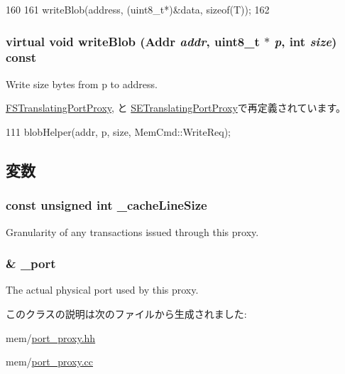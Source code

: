 \begin{DoxyCode}
160 {
161     writeBlob(address, (uint8_t*)&data, sizeof(T));
162 }
\end{DoxyCode}
\hypertarget{classPortProxy_af68c0d93cdb9ff9c4df789c4c9029709}{
\subsubsection[{writeBlob}]{\setlength{\rightskip}{0pt plus 5cm}virtual void writeBlob ({\bf Addr} {\em addr}, \/  uint8\_\-t $\ast$ {\em p}, \/  int {\em size}) const}}
\label{classPortProxy_af68c0d93cdb9ff9c4df789c4c9029709}
Write size bytes from p to address. 

\hyperlink{classFSTranslatingPortProxy_ad2a72c978fca534c6afc8b0f6ac2fe19}{FSTranslatingPortProxy}, と \hyperlink{classSETranslatingPortProxy_ad2a72c978fca534c6afc8b0f6ac2fe19}{SETranslatingPortProxy}で再定義されています。


\begin{DoxyCode}
111     { blobHelper(addr, p, size, MemCmd::WriteReq); }
\end{DoxyCode}


\subsection{変数}
\hypertarget{classPortProxy_a6e1b97389f603fc046fbb42ba91136e2}{
\subsubsection[{\_\-cacheLineSize}]{\setlength{\rightskip}{0pt plus 5cm}const unsigned int {\bf \_\-cacheLineSize}}}
\label{classPortProxy_a6e1b97389f603fc046fbb42ba91136e2}
Granularity of any transactions issued through this proxy. \hypertarget{classPortProxy_a670fb48d4e7284a258fb4ab405d2fba3}{
\subsubsection[{\_\-port}]{\& {\bf \_\-port}}}
\label{classPortProxy_a670fb48d4e7284a258fb4ab405d2fba3}
The actual physical port used by this proxy. 

このクラスの説明は次のファイルから生成されました:\begin{DoxyCompactItemize}
\item 
mem/\hyperlink{port__proxy_8hh}{port\_\-proxy.hh}\item 
mem/\hyperlink{port__proxy_8cc}{port\_\-proxy.cc}\end{DoxyCompactItemize}
